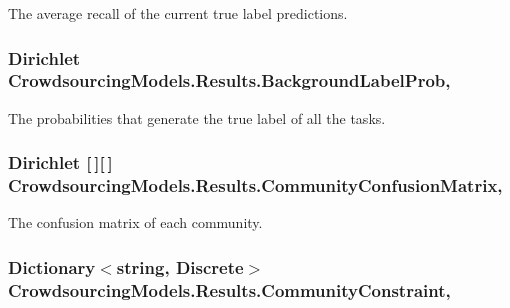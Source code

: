 The average recall of the current true label predictions. 

\hypertarget{class_crowdsourcing_models_1_1_results_ae14a29a61a13b39d0de986a4c7045df4}{}
\subsubsection[{Background\+Label\+Prob}]{\setlength{\rightskip}{0pt plus 5cm}Dirichlet Crowdsourcing\+Models.\+Results.\+Background\+Label\+Prob\hspace{0.3cm}{\ttfamily [get]}, {}}\label{class_crowdsourcing_models_1_1_results_ae14a29a61a13b39d0de986a4c7045df4}


The probabilities that generate the true label of all the tasks. 

\hypertarget{class_crowdsourcing_models_1_1_results_ad0d0152603265575be53ab612f892b6e}{}
\subsubsection[{Community\+Confusion\+Matrix}]{\setlength{\rightskip}{0pt plus 5cm}Dirichlet \mbox{[}$\,$\mbox{]}\mbox{[}$\,$\mbox{]} Crowdsourcing\+Models.\+Results.\+Community\+Confusion\+Matrix\hspace{0.3cm}{\ttfamily [get]}, {}}\label{class_crowdsourcing_models_1_1_results_ad0d0152603265575be53ab612f892b6e}


The confusion matrix of each community. 

\hypertarget{class_crowdsourcing_models_1_1_results_a71e11daa6e177bb987bb488c576e5ac5}{}
\subsubsection[{Community\+Constraint}]{\setlength{\rightskip}{0pt plus 5cm}Dictionary$<$string, Discrete$>$ Crowdsourcing\+Models.\+Results.\+Community\+Constraint\hspace{0.3cm}{\ttfamily [get]}, {}}\label{class_crowdsourcing_models_1_1_results_a71e11daa6e177bb987bb488c576e5ac5}


